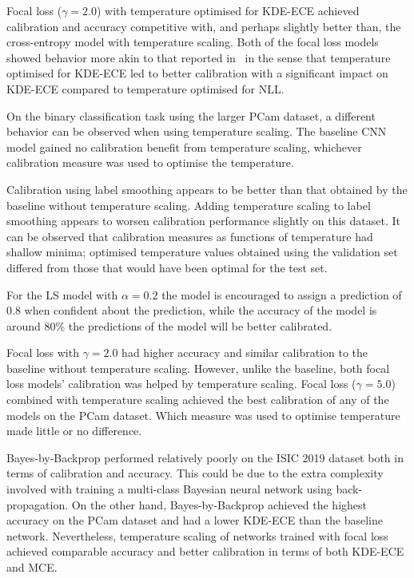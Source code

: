 Focal loss ($\gamma = 2.0$) with temperature optimised for KDE-ECE achieved calibration and accuracy competitive with, and perhaps slightly better than, the cross-entropy model with temperature scaling. Both of the focal loss models showed behavior more akin to that reported in~\cite{mukhoti2020calibrating} in the sense that temperature optimised for KDE-ECE led to better calibration with a significant impact on KDE-ECE compared to temperature optimised for NLL.

On the binary classification task using the larger PCam dataset, a different behavior can be observed when using temperature scaling. The baseline CNN model gained no calibration benefit from temperature scaling, whichever calibration measure was used to optimise the temperature. 

Calibration using label smoothing appears to be better than that obtained by the baseline without temperature scaling. Adding temperature scaling to label smoothing appears to worsen calibration performance slightly on this dataset. It can be observed that calibration measures as functions of temperature had shallow minima; optimised temperature values obtained using the validation set differed from those that would have been optimal for the test set. 

For the LS model with $\alpha=0.2$ the model is encouraged to assign a prediction of 0.8 when confident about the prediction, while the accuracy of the model is around 80\% the predictions of the model will be better calibrated. 

Focal loss with $\gamma = 2.0$ had higher accuracy and similar calibration to the baseline without temperature scaling. However, unlike the baseline, both focal loss models' calibration was helped by temperature scaling. Focal loss ($\gamma = 5.0$) combined with temperature scaling achieved the best calibration of any of the models on the PCam dataset. Which measure was used to optimise temperature made little or no difference.

Bayes-by-Backprop performed relatively poorly on the ISIC 2019 dataset both in terms of calibration and accuracy. This could be due to the extra complexity involved with training a multi-class Bayesian neural network using back-propagation. On the other hand, Bayes-by-Backprop achieved the highest accuracy on the PCam dataset and had a lower KDE-ECE than the baseline network. Nevertheless, temperature scaling of networks trained with focal loss achieved comparable accuracy and better calibration in terms of both KDE-ECE and MCE. 

